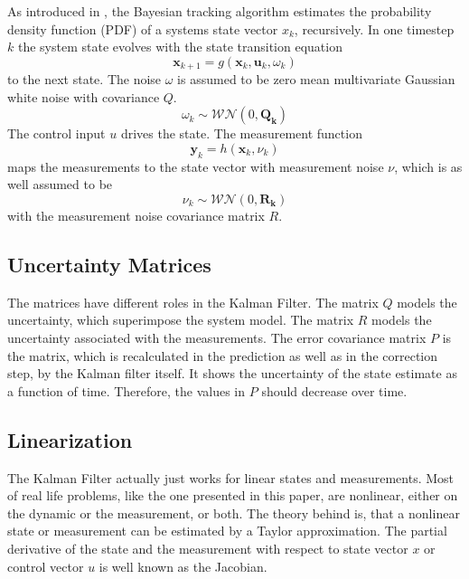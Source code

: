 \documentclass[a4paper,twoside]{article}
\begin{document}
As introduced in \cite{Kalman1960}, the Bayesian tracking algorithm estimates the probability density function (PDF) of a systems state vector $x_k$, recursively. In one timestep $k$ the system state evolves with the state transition equation
\begin{equation}\label{statetransitionequation}
\boldsymbol{x}_{k+1}=g(\boldsymbol{x}_k, \boldsymbol{u}_k,\omega_k)
\end{equation}
to the next state. The noise $\omega$ is assumed to be zero mean multivariate Gaussian white noise with covariance $Q$.
\begin{equation}\omega_{k} \sim \mathcal{WN} (0, \boldsymbol{Q_k})\end{equation}
The control input $u$ drives the state.
The measurement function
\begin{equation}\label{measurementfunction}\boldsymbol{y}_{k}=h(\boldsymbol{x}_k,\nu_k)\end{equation} maps the measurements to the state vector with measurement noise $\nu$, which is as well assumed to be
\begin{equation}\nu_{k} \sim \mathcal{WN} (0, \boldsymbol{R_k})\end{equation}
with the measurement noise covariance matrix $R$.

\subsection{Uncertainty Matrices}

The matrices have different roles in the Kalman Filter. The matrix $Q$ models the uncertainty, which superimpose the system model. The matrix $R$ models the uncertainty associated with the measurements. The error covariance matrix $P$ is the matrix, which is recalculated in the prediction as well as in the correction step, by the Kalman filter itself. It shows the uncertainty of the state estimate as a function of time. Therefore, the values in $P$ should decrease over time.

\subsection{Linearization}

The Kalman Filter actually just works for linear states and measurements. Most of real life problems, like the one presented in this paper, are nonlinear, either on the dynamic or the measurement, or both.
The theory behind is, that a nonlinear state or measurement can be estimated by a Taylor approximation. The partial derivative of the state and the measurement with respect to state vector $x$ or control vector $u$ is well known as the Jacobian.
\end{document}
